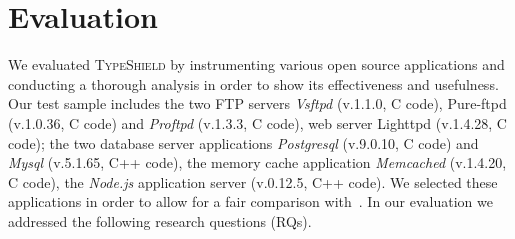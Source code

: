 \section{Evaluation}
\label{chapter:Evaluation}
We evaluated \textsc{TypeShield} by instrumenting various open source applications and 
conducting a thorough analysis in order to show its effectiveness and usefulness. 
Our test sample includes the two 
FTP servers \textit{Vsftpd} (v.1.1.0, C code), Pure-ftpd (v.1.0.36, C code) and 
\textit{Proftpd} (v.1.3.3, C code), 
web server Lighttpd (v.1.4.28, C code); 
the two database server applications 
\textit{Postgresql} (v.9.0.10, C code) and 
\textit{Mysql} (v.5.1.65, C++ code), 
the memory cache application 
\textit{Memcached} (v.1.4.20, C code), 
the \textit{Node.js} application server (v.0.12.5, C++ code). 
We selected these applications in order to allow for a fair 
comparison with~\cite{veen:typearmor}. 
In our evaluation we addressed the following research questions (RQs).

